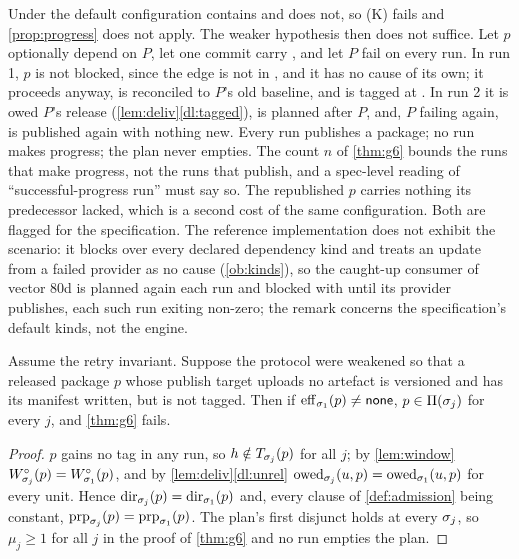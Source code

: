 \begin{remark}
\label{rem:optional}
Under the default configuration \Kprop{} contains
 and \Kblock{} does not, so (K) fails and
\cref{prop:progress} does not apply. The weaker hypothesis then does not
suffice. Let $p$ optionally depend on $P$, let one commit carry
, and let $P$ fail on every run. In run 1, $p$ is not
blocked, since the edge is not in \Kblock{}, and it has no cause of its own;
it proceeds anyway, is reconciled to $P$'s old baseline, and is tagged at
\Head{}. In run 2 it is owed $P$'s release (\cref{lem:deliv}\ref{dl:tagged}),
is planned after $P$, and, $P$ failing again, is published again with nothing
new. Every run publishes a package; no run makes progress; the plan never
empties. The count $n$ of \cref{thm:g6} bounds the runs that make progress,
not the runs that publish, and a spec-level reading of ``successful-progress
run'' must say so. The republished $p$ carries nothing its predecessor lacked,
which is a second cost of the same configuration. Both are flagged for the
specification. The reference implementation does not exhibit the scenario:
it blocks over every declared dependency kind and treats an update from a
failed provider as no cause (\cref{ob:kinds}), so the caught-up consumer of
vector 80d is planned again each run and blocked with  until its
provider publishes, each such run exiting non-zero; the remark concerns the
specification's default kinds, not the engine.
\end{remark}

\begin{proposition}
\label{prop:tagall}
Assume the retry invariant. Suppose the protocol were weakened so that a released package $p$ whose publish
target uploads no artefact is versioned and has its manifest written, but is
not tagged. Then if $\mathrm{eff}_{\sigma_1}(p) \neq \mathsf{none}$, $p \in \Pi(\sigma_j)$ for
every $j$, and \cref{thm:g6} fails.
\end{proposition}

\begin{proof}
$p$ gains no tag in any run, so $h \notin T_{\sigma_j}(p)$ for all $j$; by
\cref{lem:window} $W^{\circ}_{\sigma_j}(p) = W^{\circ}_{\sigma_1}(p)$, and by
\cref{lem:deliv}\ref{dl:unrel} $\mathrm{owed}_{\sigma_j}(u,p) = \mathrm{owed}_{\sigma_1}(u,p)$ for
every unit. Hence $\mathrm{dir}_{\sigma_j}(p) = \mathrm{dir}_{\sigma_1}(p)$ and, every clause of
\cref{def:admission} being constant, $\mathrm{prp}_{\sigma_j}(p) = \mathrm{prp}_{\sigma_1}(p)$.
The plan's first disjunct holds at every $\sigma_j$, so $\mu_j \geq 1$ for all $j$
in the proof of \cref{thm:g6} and no run empties the plan.
\end{proof}

